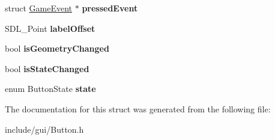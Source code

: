 \begin{DoxyCompactItemize}
struct \hyperlink{struct_game_event}{Game\+Event} $\ast$ {\bfseries pressed\+Event}
\item 
\hypertarget{struct_button_ac8658f1193098d53c4bd1bdcab7df6af}{}\label{struct_button_ac8658f1193098d53c4bd1bdcab7df6af} 
S\+D\+L\+\_\+\+Point {\bfseries label\+Offset}
\item 
\hypertarget{struct_button_a8ea7e8ac3e3330830aa7a4309390f3ac}{}\label{struct_button_a8ea7e8ac3e3330830aa7a4309390f3ac} 
bool {\bfseries is\+Geometry\+Changed}
\item 
\hypertarget{struct_button_abbe46dfeadc7ca8af4ccd6a1e60fa560}{}\label{struct_button_abbe46dfeadc7ca8af4ccd6a1e60fa560} 
bool {\bfseries is\+State\+Changed}
\item 
\hypertarget{struct_button_a98525fefb11846bc0e1ee154b0a106d4}{}\label{struct_button_a98525fefb11846bc0e1ee154b0a106d4} 
enum Button\+State {\bfseries state}
\end{DoxyCompactItemize}


The documentation for this struct was generated from the following file\+:\begin{DoxyCompactItemize}
\item 
include/gui/Button.\+h\end{DoxyCompactItemize}
